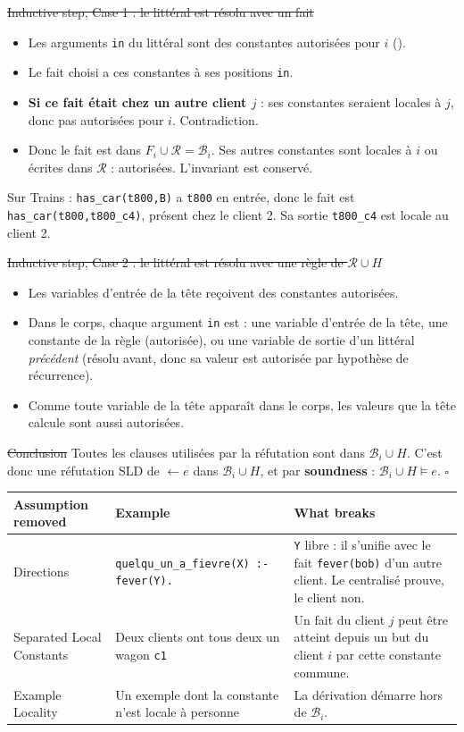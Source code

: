 \documentclass[10pt]{article}
\begin{document}
\st{Inductive step, Case 1 : le littéral est résolu avec un fait}
\begin{itemize}
  \item Les arguments \texttt{in} du littéral sont des constantes autorisées pour $i$ ().
  \item Le fait choisi a ces constantes à ses positions \texttt{in}.
  \item \textbf{Si ce fait était chez un autre client $j$} : ses constantes seraient locales à $j$, donc pas
        autorisées pour $i$. Contradiction.
  \item Donc le fait est dans $F_i\cup\mathcal{R}=\mathcal{B}_i$. Ses autres constantes sont locales à $i$ ou
        écrites dans $\mathcal{R}$ : autorisées. L'invariant est conservé.
\end{itemize}
Sur Trains : \texttt{has\_car(t800,B)} a \texttt{t800} en entrée, donc le fait est
\texttt{has\_car(t800,t800\_c4)}, présent chez le client 2. Sa sortie \texttt{t800\_c4} est locale au client 2.

\st{Inductive step, Case 2 : le littéral est résolu avec une règle de $\mathcal{R}\cup H$}
\begin{itemize}
  \item Les variables d'entrée de la tête reçoivent des constantes autorisées.
  \item Dans le corps, chaque argument \texttt{in} est : une variable d'entrée de la tête, une constante de la règle
        (autorisée), ou une variable de sortie d'un littéral \emph{précédent} (résolu avant, donc sa valeur est
        autorisée par hypothèse de récurrence).
  \item Comme toute variable de la tête apparaît dans le corps, les valeurs que la tête calcule sont aussi autorisées.
\end{itemize}

\st{Conclusion}
Toutes les clauses utilisées par la réfutation sont dans $\mathcal{B}_i\cup H$. C'est donc une réfutation SLD
de $\leftarrow e$ dans $\mathcal{B}_i\cup H$, et par \textbf{soundness} : $\mathcal{B}_i\cup H\models e$. \hfill $\square$

\renewcommand{\arraystretch}{1.3}
\begin{tabular}{@{}L{3.4cm}L{6cm}L{7cm}@{}}
\textbf{Assumption removed} & \textbf{Example} & \textbf{What breaks}\\\hline
Directions & \texttt{quelqu\_un\_a\_fievre(X) :- fever(Y).} & \texttt{Y} libre : il s'unifie avec le fait \texttt{fever(bob)} d'un autre client. Le centralisé prouve, le client non.\\
Separated Local Constants & Deux clients ont tous deux un wagon \texttt{c1} & Un fait du client $j$ peut être atteint depuis un but du client $i$ par cette constante commune.\\
Example Locality & Un exemple dont la constante n'est locale à personne & La dérivation démarre hors de $\mathcal{B}_i$.\\
\end{tabular}
\end{document}
